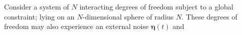 Consider a system of $N$ interacting degrees of freedom subject to a global constraint; lying on an $N$-dimensional sphere of radius $N$. These degrees of freedom may also experience an external noise $\mathbf{\eta}(t)$ and 